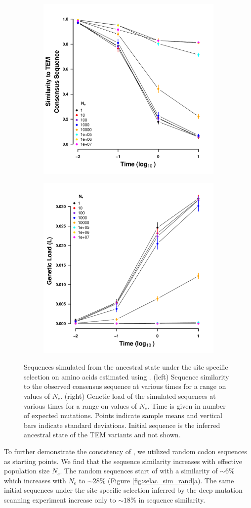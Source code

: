 \documentclass[12pt]{article}
\begin{document}
\begin{figure}[h]
    \centering
    \begin{subfigure}
        \centering
        \includegraphics[width=.45\textwidth]{img/simulated_dist_time_SELAC_ancest.pdf}
    \end{subfigure}
    \begin{subfigure}
        \centering
        \includegraphics[width=.45\textwidth]{img/simulated_gl_time_SELAC_ancest.pdf}
    \end{subfigure}
    \caption{Sequences simulated from the ancestral state under the site specific selection on amino acids estimated using \selac. 
    (left) Sequence similarity to the observed consensus sequence at various times for a range on values of $N_e$.
    (right) Genetic load of the simulated sequences at various times for a range on values of $N_e$.
    Time is given in number of expected mutations.
    Points indicate sample means and vertical bars indicate standard deviations. Initial sequence is the inferred ancestral state of the TEM variants and not shown.}
    \label{fig:selac_sim}
\end{figure}

To further demonstrate the consistency of \selac, we utilized random codon sequences as starting points.
We find that the sequence similarity increases with effective population size $N_e$.
The random sequences start of with a similarity of $\sim6 \%$ which increases with $N_e$ to $\sim28 \%$ (Figure \ref{fig:selac_sim_rand}a).
The same initial sequences under the site specific selection inferred by the deep mutation scanning experiment increase only to $\sim18 \%$ in sequence similarity.
\end{document}

